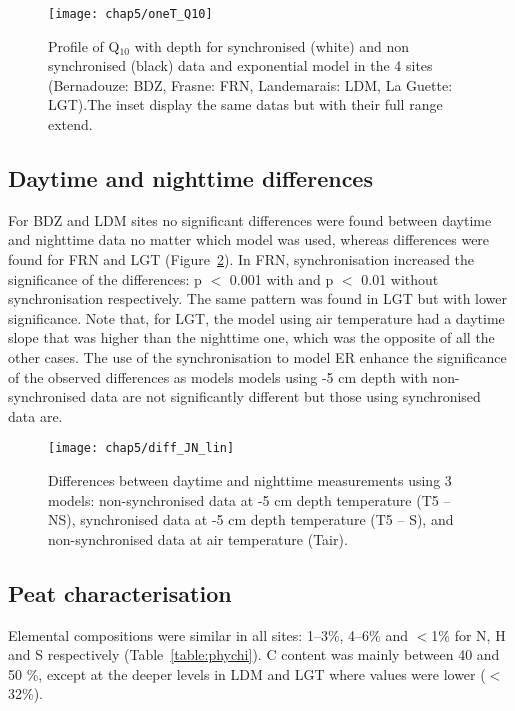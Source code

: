 \begin{figure}
\centering
\texttt{[image: chap5/oneT\_Q10]}
\caption{Profile of Q$_{10}$ with depth for synchronised (white) and non synchronised (black) data and exponential model in the 4 sites (Bernadouze: BDZ, Frasne: FRN, Landemarais: LDM, La Guette: LGT).The inset display the same datas but with their full range extend.}
\label{fig:oneT_Q10}
\end{figure}

\subsection{Daytime and nighttime differences}


For BDZ and LDM sites no significant differences were found between daytime and nighttime data no matter which model was used, whereas differences were found for FRN and LGT (Figure~\ref{fig:diff_JN}). 
In FRN, synchronisation increased the significance of the differences: p $<$ 0.001 with and p $<$ 0.01 without synchronisation respectively.
The same pattern was found in LGT but with lower significance.
Note that, for LGT, the model using air temperature had a daytime slope that was higher than the nighttime one, which was the opposite of all the other cases.
The use of the synchronisation to model ER enhance the significance of the observed differences as models models using -5 cm depth with non-synchronised data are not significantly different but those using synchronised data are.

\begin{figure}
\centering
\texttt{[image: chap5/diff\_JN\_lin]}
\caption{Differences between daytime and nighttime measurements using 3 models: non-synchronised data at -5 cm depth temperature (T5 -- NS), synchronised data at -5 cm depth temperature (T5 -- S), and non-synchronised data at air temperature (Tair).}
\label{fig:diff_JN}
\end{figure}

\subsection{Peat characterisation}

Elemental compositions were similar in all sites: 1--3\%, 4--6\% and $<$1\% for N, H and S respectively (Table~\ref{table:phychi}).
C content was mainly between 40 and 50 \%, except at the deeper levels in LDM and LGT where values were lower ($<$ 32\%).


